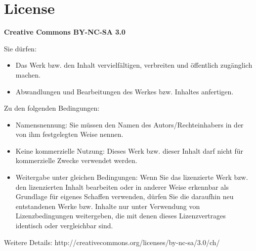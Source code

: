 {\scriptsize 
\section*{License}
\textbf{Creative Commons BY-NC-SA 3.0}

Sie dürfen:
\begin{itemize}
    \item Das Werk bzw. den Inhalt vervielfältigen, verbreiten und öffentlich
    zugänglich machen.
    \item Abwandlungen und Bearbeitungen des Werkes bzw. Inhaltes anfertigen.
\end{itemize}
Zu den folgenden Bedingungen:
\begin{itemize}
    \item Namensnennung: Sie müssen den Namen des Autors/Rechteinhabers in der von ihm
    festgelegten Weise nennen.
    \item Keine kommerzielle Nutzung: Dieses Werk bzw. dieser Inhalt darf nicht für
    kommerzielle Zwecke verwendet werden.
    \item  Weitergabe unter gleichen Bedingungen: Wenn Sie das lizenzierte Werk bzw. den
    lizenzierten Inhalt bearbeiten oder in anderer Weise erkennbar als Grundlage
    für eigenes Schaffen verwenden, dürfen Sie die daraufhin neu entstandenen
    Werke bzw. Inhalte nur unter Verwendung von Lizenzbedingungen weitergeben,
    die mit denen dieses Lizenzvertrages identisch oder vergleichbar sind.
\end{itemize}
Weitere Details: http://creativecommons.org/licenses/by-nc-sa/3.0/ch/
}
\clearpage
{}%